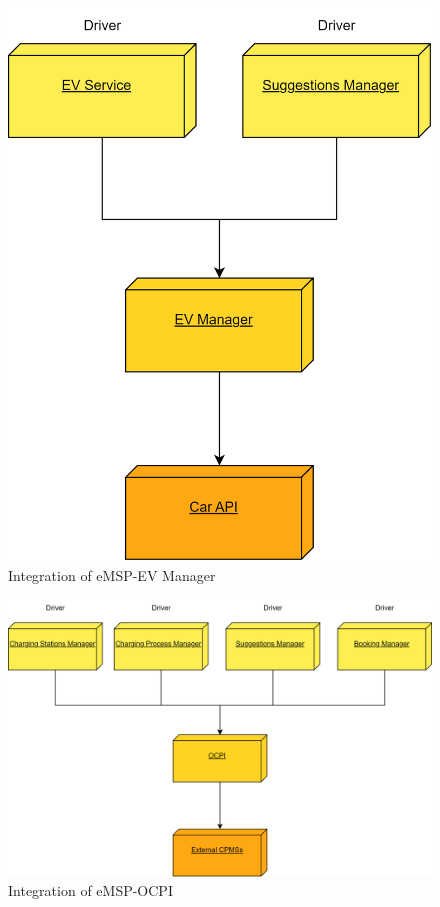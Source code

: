 \documentclass[table, 12pt]{article}
\begin{document}
\begin{figure}[H]
    \centering
    \includegraphics[scale=0.6]{assets/Integration Diagrams/eMSP-EV Manager.png} 
    \caption{Integration of eMSP-EV Manager}%
    \label{fig: eMSP-EV Manager}%
\end{figure}

\begin{figure}[H]
    \centering
    \includegraphics[scale=0.6]{assets/Integration Diagrams/eMSP-OCPI.png} 
    \caption{Integration of eMSP-OCPI}%
    \label{fig: eMSP-OCPI Manager}%
\end{figure}
\end{document}
